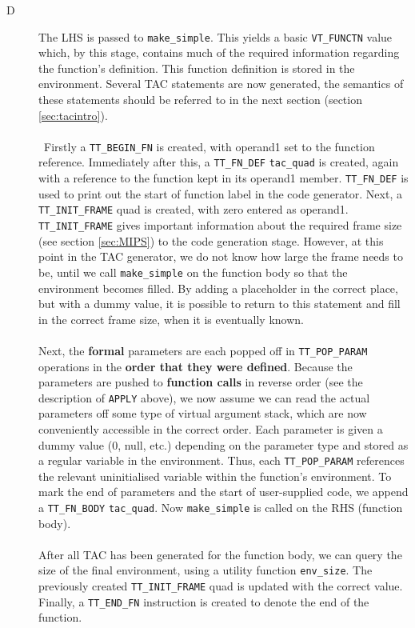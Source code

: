 \begin{description}
		\begin{description}
			\item[D] The LHS is passed to \verb!make_simple!. This yields a basic \verb!VT_FUNCTN! value which, by this stage, contains much of the required information regarding the function's definition. This function definition is stored in the environment. Several TAC statements are now generated, the semantics of these statements should be referred to in the next section (section \ref{sec:tacintro}).
\\ \ \\ \
Firstly a \verb!TT_BEGIN_FN! is created, with operand1 set to the function reference. Immediately after this, a \verb!TT_FN_DEF! \verb!tac_quad! is created, again with a reference to the function kept in its operand1 member. \verb!TT_FN_DEF! is used to print out the start of function label in the code generator. Next, a \verb!TT_INIT_FRAME! quad is created, with zero entered as operand1. \verb!TT_INIT_FRAME! gives important information about the required frame size (see section \ref{sec:MIPS}) to the code generation stage. However, at this point in the TAC generator, we do not know how large the frame needs to be, until we call \verb!make_simple! on the function body so that the environment becomes filled. By adding a placeholder in the correct place, but with a dummy value, it is possible  to return to this statement and fill in the correct frame size, when it is eventually known.
\ \\ \ \\
Next, the \textbf{formal} parameters are each popped off in \verb!TT_POP_PARAM! operations in the \textbf{order that they were defined}. Because the parameters are pushed to \textbf{function calls} in reverse order (see the description of \verb!APPLY! above), we now assume we can read the actual parameters off some type of virtual argument stack, which are now conveniently accessible in the correct order. Each parameter is given a dummy value (0, null, etc.) depending on the parameter type and stored as a regular variable in the environment. Thus, each \verb!TT_POP_PARAM! references the relevant uninitialised variable within the function's environment. To mark the end of parameters and the start of user-supplied code, we append a \verb!TT_FN_BODY! \verb!tac_quad!. Now \verb!make_simple! is called on the RHS (function body).
\ \\ \ \\
After all TAC has been generated for the function body, we can query the size of the final environment, using a utility function \verb!env_size!. The previously created \verb!TT_INIT_FRAME! quad is updated with the correct value. Finally, a \verb!TT_END_FN! instruction is created to denote the end of the function.

\end{description}
\end{description}
